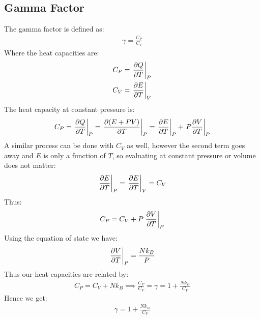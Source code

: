 \documentclass[12pt]{article}
\begin{document}
\subsection{Gamma Factor}
The gamma factor is defined as:
\begin{align*}
  \gamma=\frac{C_P}{C_V}
\end{align*}
Where the heat capacities are:
\begin{align*}
  C_P&=\eval{\pdv{Q}{T}}_P\\
  C_V&=\eval{\pdv{E}{T}}_V
\end{align*}
The heat capacity at constant pressure is:
\begin{align*}
  C_P=\eval{\pdv{Q}{T}}_P=\eval{\pdv{(E+PV)}{T}}_P
  =\eval{\pdv{E}{T}}_P+\eval{P\pdv{V}{T}}_P
\end{align*}
A similar process can be done with $C_V$ as well, however the second term goes away and $E$ is only a function of $T$, so evaluating at constant pressure or volume does not matter:
\begin{align*}
  \eval{\pdv{E}{T}}_P=\eval{\pdv{E}{T}}_V=C_V
\end{align*}
Thus:
\begin{align*}
  C_P=C_V+P\eval{\pdv{V}{T}}_{P}
\end{align*}
Using the equation of state we have:
\begin{align*}
  \eval{\pdv{V}{T}}_P=\frac{Nk_B}{P}
\end{align*}
Thus our heat capacities are related by:
\begin{align*}
  C_P=C_V+Nk_B\implies\frac{C_P}{C_V}=\gamma=1+\frac{Nk_B}{C_V}
\end{align*}
Hence we get:
\begin{align}
  \boxed{\gamma=1+\frac{Nk_B}{C_V}}
\end{align}
\end{document}
